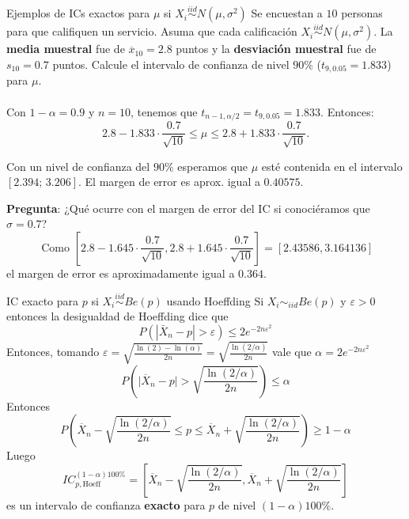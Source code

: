 \documentclass{beamer}
\theoremstyle{definition}
\newcommand{\eps}{\varepsilon}
\begin{document}
\begin{frame}{\color{rosee}Ejemplos de ICs exactos para $\mu$ si $X_i\stackrel{iid}{\sim}N(\mu,\sigma^2)$}\small
Se encuestan a $10$ personas para que califiquen un servicio. Asuma que cada calificación $X_i\stackrel{iid}{\sim}N(\mu,\sigma^2)$. La \textbf{media muestral} fue de $\overline{x}_{10} = 2.8$ puntos y la \textbf{desviación muestral} fue de $s_{10} = 0.7$ puntos. Calcule el intervalo de confianza de nivel $90\%$ ($t_{9, 0.05} = 1.833$) para $\mu$.\\~\\

Con $1-\alpha=0.9$ y $n=10$, tenemos que $t_{n-1,\alpha/2 } = t_{9, 0.05} = 1.833$. Entonces: %
$$2.8 - 1.833 \cdot \frac{0.7}{\sqrt{10}} \leq \mu \leq 2.8 + 1.833\cdot \frac{0.7}{\sqrt{10}} .$$

Con un nivel de confianza del $90\%$ esperamos que $\mu$ esté contenida en el intervalo $[2.394;\, 3.206]$. El margen de error es aprox. igual a $0.40575$. 

\textbf{Pregunta}: ¿Qué ocurre con el margen de error del IC si conociéramos que $\sigma = 0.7$?
$$ \text{ Como } \left[2.8 - 1.645 \cdot \frac{0.7}{\sqrt{10}} , 2.8 + 1.645\cdot \frac{0.7}{\sqrt{10}}\right]=[2.43586,3.164136]$$
el margen de error es aproximadamente igual a $0.364$.
\end{frame}



\begin{frame}{\color{rosee}IC exacto para $p$ si $X_i\stackrel{iid}{\sim}Be(p)$ usando Hoeffding} \small
Si $X_i\sim_{iid} Be(p)$ y $\varepsilon>0$ entonces la desigualdad de Hoeffding dice que $$P\left(|\bar{X}_n-p|>\varepsilon\right)\leq 2 e^{-2n\varepsilon^2}$$
Entonces, tomando $\eps=\sqrt{\frac{\ln(2)-\ln(\alpha)}{2n}}=\sqrt{\frac{\ln(2/\alpha)}{2n}}$ vale que $\alpha=2e^{-2n\eps^2}$
$$P\left(\Big\vert\overline{X}_n- p \Big\vert>\sqrt{\frac{\ln(2/\alpha)}{2n}}\right)\leq \alpha$$
Entonces 
$$P\left(\overline{X}_n-\sqrt{\frac{\ln(2/\alpha)}{2n}}\leq p \leq \overline{X}_n+\sqrt{\frac{\ln(2/\alpha)}{2n}}\right)\geq 1-\alpha$$
 Luego \[IC_{p,\text{Hoeff}}^{(1-\alpha)100\%}=\left[\overline{X}_n-\sqrt{\frac{\ln(2/\alpha)}{2n}}, \overline{X}_n+\sqrt{\frac{\ln(2/\alpha)}{2n}}\right]\]
    es un intervalo de confianza \textbf{exacto} para $p$ de nivel
    $(1-\alpha)100\%$.
   
\end{frame}
\end{document}
